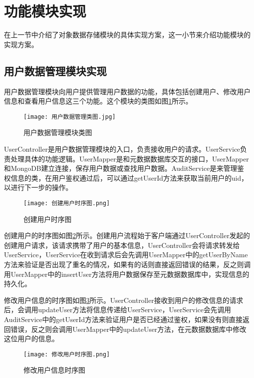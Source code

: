 \section{功能模块实现}%
在上一节中介绍了对象数据存储模块的具体实现方案，这一小节来介绍功能模块的实现方案。

\subsection{用户数据管理模块实现}
用户数据管理模块向用户提供管理用户数据的功能，具体包括创建用户、修改用户信息和查看用户信息这三个功能。这个模块的类图如图\ref{用户数据管理模块类图}所示。

\begin{figure}
  \centering
  \texttt{[image: 用户数据管理类图.jpg]}
  \caption{用户数据管理模块类图}
  \label{用户数据管理模块类图}
\end{figure}

UserController是用户数据管理模块的入口，负责接收用户的请求。UserService负责处理具体的功能逻辑。UserMapper是和元数据数据库交互的接口，UserMapper和MongoDB建立连接，保存用户数据或查找用户数据。AuditService是来管理鉴权信息的类，在用户鉴权通过后，可以通过getUserId方法来获取当前用户的uid，以进行下一步的操作。

\begin{figure}
  \centering
  \texttt{[image: 创建用户时序图.png]}
  \caption{创建用户时序图}
  \label{创建用户时序图}
\end{figure}

创建用户的时序图如图\ref{创建用户时序图}所示。创建用户流程始于客户端通过UserController发起的创建用户请求，该请求携带了用户的基本信息，UserController会将请求转发给UserService，UserService在收到请求后会先调用UserMapper中的getUserByName方法来验证是否出现了重名的情况，如果有的话则直接返回错误的结果，反之则调用UserMapper中的insertUser方法将用户数据保存至元数据数据库中，实现信息的持久化。

修改用户信息的时序图如图\ref{修改用户信息时序图}所示。UserController接收到用户的修改信息的请求后，会调用updateUser方法将信息传递给UserService，UserService会先调用AuditService中的getUserId方法来验证用户是否已经通过鉴权，如果没有则直接返回错误，反之则会调用UserMapper中的updateUser方法，在元数据数据库中修改这位用户的信息。

\begin{figure}
  \centering
  \texttt{[image: 修改用户时序图.png]}
  \caption{修改用户信息时序图}
  \label{修改用户信息时序图}
\end{figure}

